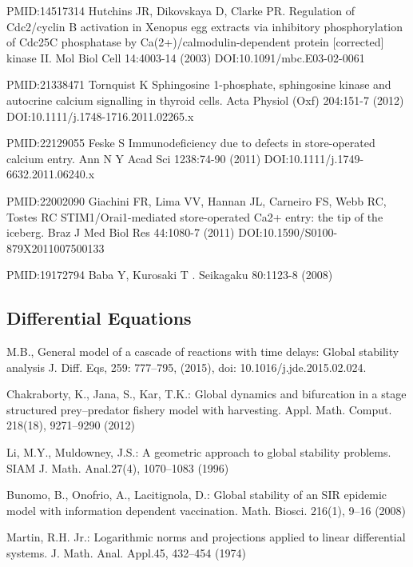 \begin{thebibliography}{00}
PMID:14517314
 	Hutchins JR, Dikovskaya D, Clarke PR.
\newblock Regulation of Cdc2/cyclin B activation in Xenopus egg extracts via inhibitory phosphorylation of Cdc25C phosphatase by Ca(2+)/calmodulin-dependent protein [corrected] kinase II.
\newblock Mol Biol Cell 14:4003-14 (2003) DOI:10.1091/mbc.E03-02-0061

PMID:21338471
 Tornquist K
\newblock Sphingosine 1-phosphate, sphingosine kinase and autocrine calcium signalling in thyroid cells.
\newblock Acta Physiol (Oxf) 204:151-7 (2012) DOI:10.1111/j.1748-1716.2011.02265.x

PMID:22129055
 Feske S
\newblock Immunodeficiency due to defects in store-operated calcium entry.
\newblock Ann N Y Acad Sci 1238:74-90 (2011) DOI:10.1111/j.1749-6632.2011.06240.x

PMID:22002090
 Giachini FR, Lima VV, Hannan JL, Carneiro FS, Webb RC, Tostes RC
\newblock STIM1/Orai1-mediated store-operated Ca2+ entry: the tip of the iceberg.
\newblock Braz J Med Biol Res 44:1080-7 (2011) DOI:10.1590/S0100-879X2011007500133

PMID:19172794
 Baba Y, Kurosaki T
.
\newblock Seikagaku 80:1123-8 (2008)


\subsection{Differential Equations}

M.B., 
\newblock General model of a cascade of reactions with time delays: Global stability analysis
\newblock J. Diff. Eqs, 259: 777–795, (2015), doi: 10.1016/j.jde.2015.02.024.

Chakraborty, K., Jana, S., Kar, T.K.: 
\newblock Global dynamics and bifurcation in a stage structured prey–predator fishery model with harvesting. 
\newblock Appl. Math. Comput. 218(18), 9271–9290 (2012)

Li, M.Y., Muldowney, J.S.: 
\newblock A geometric approach to global stability problems. 
\newblock SIAM J. Math. Anal.27(4), 1070–1083 (1996)

Bunomo, B., Onofrio, A., Lacitignola, D.: 
\newblock Global stability of an SIR epidemic model with information dependent vaccination. 
\newblock Math. Biosci. 216(1), 9–16 (2008)

Martin,   R.H.   Jr.:   
\newblock Logarithmic   norms   and   projections   applied   to   linear   differential   systems.
\newblock J. Math. Anal. Appl.45, 432–454 (1974)


\end{thebibliography}
